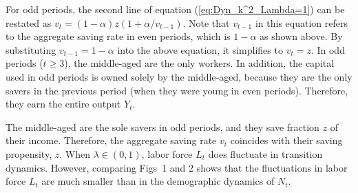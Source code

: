 \documentclass[nogrid]{MBE}%
\begin{document}
{For odd periods, the second line of equation (\ref{eq:Dyn_k^2_Lambda=1}) can
be restated as $v_{t}=\left(  1-\alpha\right)  z \left(  1+{\alpha}/{v_{t-1}%
}\right)  $. Note that $v_{t-1}$ in this equation refers to the aggregate saving rate in even
periods, which is $1-\alpha$ as shown above. By substituting $v_{t-1}=1-\alpha$ into the above
equation, it simplifies to $v_{t}=z$. In odd periods ($t\geq3$), the middle-aged are the only
workers. In addition, the capital used in odd periods is owned solely by the middle-aged, because
they are the only savers in the previous period (when they were young in even periods). Therefore,
they earn the entire output $Y_{t}$.

\begin{flLem}
The middle-aged are the sole savers in odd periods, and they save fraction $z$ of their income.
Therefore, the aggregate saving rate $v_{t}$ coincides with their saving propensity, $z$. {When
$\lambda\in(0,1)$, labor force $L_{t}$ does fluctuate in transition dynamics. However, comparing
Figs~1 and 2 shows that the fluctuations in labor force $L_{t}$ are much smaller than in the
demographic dynamics of $N_{t}$.}
\end{flLem}

}
\end{document}
